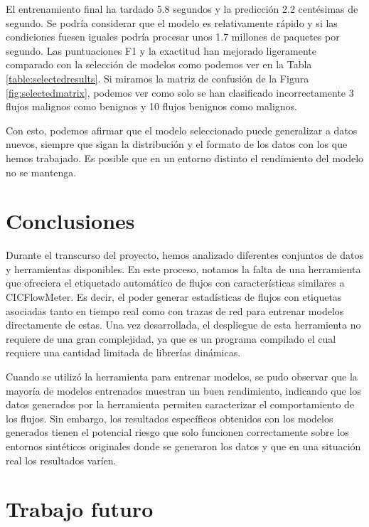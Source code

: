 \documentclass[10pt,a4paper,twoside]{article}
\begin{document}
\begin{multicols*}{2}
    El entrenamiento final ha tardado 5.8 segundos y la predicción 2.2 centésimas de segundo. Se podría considerar que el modelo es relativamente rápido y si las condiciones fuesen iguales podría procesar unos 1.7 millones de paquetes por segundo. Las puntuaciones F1 y la exactitud han mejorado ligeramente comparado con la selección de modelos como podemos ver en la Tabla \ref{table:selectedresults}. Si miramos la matriz de confusión de la Figura \ref{fig:selectedmatrix}, podemos ver como solo se han clasificado incorrectamente 3 flujos malignos como benignos y 10 flujos benignos como malignos.

    Con esto, podemos afirmar que el modelo seleccionado puede generalizar a datos nuevos, siempre que sigan la distribución y el formato de los datos con los que hemos trabajado. Es posible que en un entorno distinto el rendimiento del modelo no se mantenga.
    
    \section{Conclusiones} \label{conclusiones}

    Durante el transcurso del proyecto, hemos analizado diferentes conjuntos de datos y herramientas disponibles. En este proceso, notamos la falta de una herramienta que ofreciera el etiquetado automático de flujos con características similares a CICFlowMeter. Es decir, el poder generar estadísticas de flujos con etiquetas asociadas tanto en tiempo real como con trazas de red para entrenar modelos directamente de estas. Una vez desarrollada, el despliegue de esta herramienta no requiere de una gran complejidad, ya que es un programa compilado el cual requiere una cantidad limitada de librerías dinámicas.

    Cuando se utilizó la herramienta para entrenar modelos, se pudo observar que la mayoría de modelos entrenados muestran un buen rendimiento, indicando que los datos generados por la herramienta permiten caracterizar el comportamiento de los flujos. Sin embargo, los resultados específicos obtenidos con los modelos generados tienen el potencial riesgo que solo funcionen correctamente sobre los entornos sintéticos originales donde se generaron los datos y que en una situación real los resultados varíen.
    
    \section{Trabajo futuro} \label{tabajofuturo}


\end{multicols*}
\end{document}
